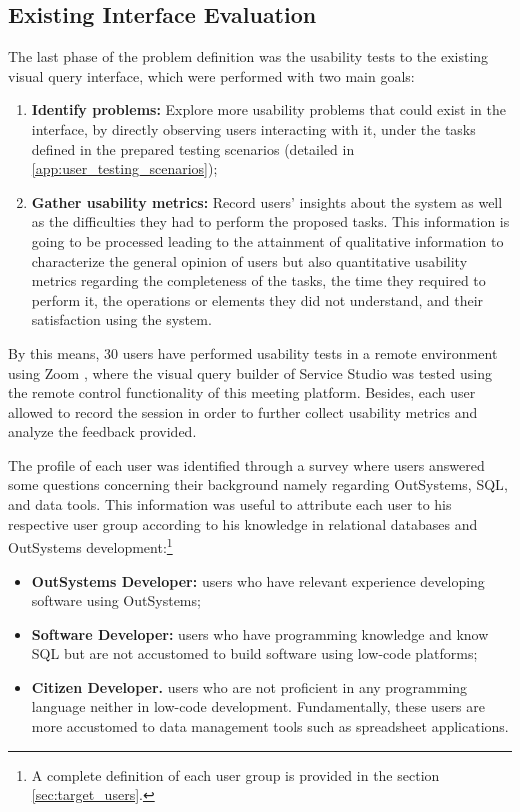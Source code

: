 \subsection{Existing Interface Evaluation}
\label{sec:existing_interface_evaluation}
The last phase of the problem definition was the usability tests to the existing visual query interface, which were performed with two main goals:

\begin{enumerate}
    \item \textbf{Identify problems:} Explore more usability problems that could exist in the interface, by directly observing users interacting with it, under the tasks defined in the prepared testing scenarios (detailed in \ref{app:user_testing_scenarios});
    \item \textbf{Gather usability metrics:} Record users' insights about the system as well as the difficulties they had to perform the proposed tasks. This information is going to be processed leading to the attainment of qualitative information to characterize the general opinion of users but also quantitative usability metrics regarding the completeness of the tasks, the time they required to perform it, the operations or elements they did not understand, and their satisfaction using the system.
\end{enumerate}

By this means, 30 users have performed usability tests in a remote environment using Zoom \cite{zoom}, where the visual query builder of Service Studio was tested using the remote control functionality of this meeting platform. Besides, each user allowed to record the session in order to further collect usability metrics and analyze the feedback provided.

The profile of each user was identified through a survey where users answered some questions concerning their background namely regarding OutSystems, \gls{SQL}, and data tools. This information was useful to attribute each user to his respective user group according to his knowledge in relational databases and OutSystems development:\footnote{A complete definition of each user group is provided in the section \ref{sec:target_users}.}

\begin{itemize}
    \item \textbf{OutSystems Developer: }users who have relevant experience developing software using OutSystems;
    \item \textbf{Software Developer: }users who have programming knowledge and know \gls{SQL} but are not accustomed to build software using low-code platforms;
    \item \textbf{Citizen Developer. }users who are not proficient in any programming language neither in low-code development. Fundamentally, these users are more accustomed to data management tools such as spreadsheet applications.
\end{itemize}


